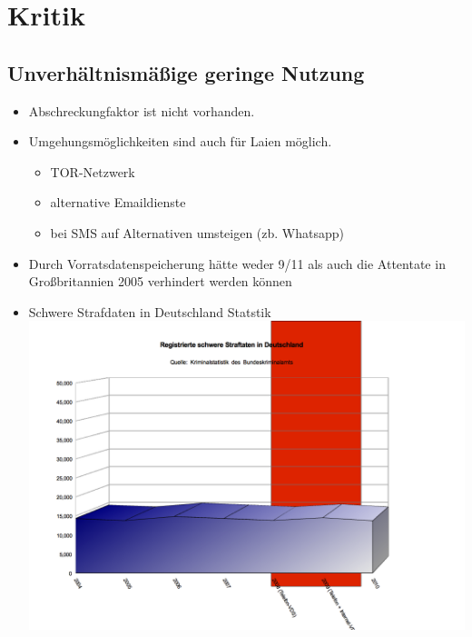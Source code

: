 \section{Kritik}
  \subsection{Unverhältnismäßige geringe Nutzung}
    \begin{frame}
      \begin{itemize}
        \item
          Abschreckungfaktor ist nicht vorhanden.
         \item
         Umgehungsmöglichkeiten sind auch für Laien möglich.
           \begin{itemize}
         \item TOR-Netzwerk
         \item alternative Emaildienste
         \item bei SMS auf Alternativen umsteigen (zb. Whatsapp)
      \end{itemize}
        \item
       	Durch Vorratsdatenspeicherung hätte weder 9/11 als auch die Attentate in Großbritannien 2005 verhindert werden können
      \end{itemize}
    \end{frame}

\begin{frame}
\begin{itemize}
        \item Schwere Strafdaten in Deutschland Statstik
        \includegraphics[height=1\textheight]{sections/img/schwere_verbrechen_in_DE.png}
    \end{itemize}
    \end{frame}
    
